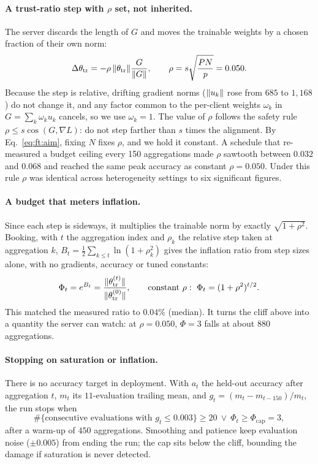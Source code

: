 \paragraph{A trust-ratio step with $\rho$ set, not inherited.}\label{sec:ft:step}
The server discards the length of $G$ and moves the trainable weights by a chosen fraction of their own norm:
\begin{equation}
\Delta\theta_{\mathrm{tr}}=-\rho\,\lVert \theta_{\mathrm{tr}}\rVert\frac{G}{\lVert G\rVert},\qquad\rho=s\sqrt{\frac{PN}{p}}=0.050 .
\label{eq:ft:step}
\end{equation}
Because the step is relative, drifting gradient norms ($\lVert u_k\rVert$ rose from $685$ to $1{,}168$) do not change it, and any factor common to the per-client weights $\omega_k$ in $G=\sum_k\omega_ku_k$ cancels, so we use $\omega_k=1$.
The value of $\rho$ follows the safety rule $\rho\le s\cos(G,\nabla L)$: do not step farther than $s$ times the alignment. By Eq.~\eqref{eq:ft:aim}, fixing $N$ fixes $\rho$, and we hold it constant.
A schedule that re-measured a budget ceiling every 150 aggregations made $\rho$ sawtooth between $0.032$ and $0.068$ and reached the same peak accuracy as constant $\rho=0.050$.
Under this rule $\rho$ was identical across heterogeneity settings to six significant figures.

\paragraph{A budget that meters inflation.}\label{sec:ft:budget}
Since each step is sideways, it multiplies the trainable norm by exactly $\sqrt{1+\rho^2}$. Booking, with $t$ the aggregation index and $\rho_k$ the relative step taken at aggregation $k$,
$B_t=\tfrac12\sum_{k\le t}\ln(1+\rho_k^2)$ gives the inflation ratio from step sizes alone, with no gradients, accuracy or tuned constants:
\begin{equation}
\Phi_t=e^{B_t}=\frac{\lVert \theta_{\mathrm{tr}}^{(t)}\rVert}{\lVert \theta_{\mathrm{tr}}^{(0)}\rVert},\qquad\text{constant }\rho:\ \Phi_t=(1+\rho^2)^{t/2}.
\label{eq:ft:phi}
\end{equation}
This matched the measured ratio to $0.04\%$ (median). It turns the cliff above into a quantity the server can watch: at $\rho=0.050$, $\Phi=3$ falls at about $880$ aggregations.

\paragraph{Stopping on saturation or inflation.}\label{sec:ft:stop}
There is no accuracy target in deployment. With $a_t$ the held-out accuracy after aggregation $t$, $m_t$ its $11$-evaluation trailing mean, and $g_t=(m_t-m_{t-150})/m_t$, the run stops when
\begin{equation}
\#\{\text{consecutive evaluations with }g_t\le0.003\}\ge20\ \lor\ \Phi_t\ge\Phi_{\mathrm{cap}}=3,
\label{eq:ft:stop}
\end{equation}
after a warm-up of $450$ aggregations. Smoothing and patience keep evaluation noise ($\pm0.005$) from ending the run; the cap sits below the cliff, bounding the damage if saturation is never detected.

